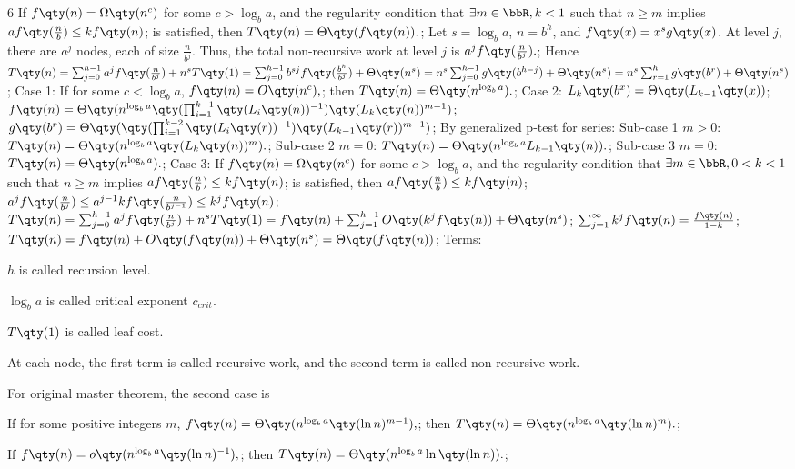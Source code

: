 \documentclass[a4paper,10pt]{extarticle}
\begin{document}
\begin{multicols}{6}
If $f\qty(n)=\Omega\qty(n^c)$ for some $c>\log_ba$, and the regularity condition that $\exists m\in\bbR,k<1$ such that $n\ge m$ implies
\(af\qty(\frac{n}{b})\le kf\qty(n)\); 
is satisfied, then
\(T\qty(n)=\Theta\qty(f\qty(n)).\); 
\bpr
Let $s=\log_ba$, $n=b^h$, and $f\qty(x)=x^sg\qty(x)$. At level $j$, there are $a^j$ nodes, each of size $\frac{n}{b^j}$. Thus, the total non-recursive work at level $j$ is
\(a^jf\qty(\frac{n}{b^j}).\); 
Hence
\(
T\qty(n)=\sum_{j=0}^{h-1}a^jf\qty(\frac{n}{b^j})+n^sT\qty(1)
=\sum_{j=0}^{h-1}b^{sj}f\qty(\frac{b^h}{b^j})+\Theta\qty(n^s)
=n^s\sum_{j=0}^{h-1}g\qty(b^{h-j})+\Theta\qty(n^s)
=n^s\sum_{r=1}^hg\qty(b^r)+\Theta\qty(n^s)
\); 
Case 1: If for some $c<\log_ba$,
\(f\qty(n)=O\qty(n^c),\); 
then
\(T\qty(n)=\Theta\qty(n^{\log_ba}).\); 
Case 2:
\(L_{k}\qty(b^x)=\Theta\qty(L_{k-1}\qty(x))\); 
\(f\qty(n)=\Theta\qty(n^{\log_ba}\qty(\prod_{i=1}^{k-1}\qty(L_{i}\qty(n))^{-1})\qty(L_{k}\qty(n))^{m-1})\); 
\(g\qty(b^r)=\Theta\qty(\qty(\prod_{i=1}^{k-2}\qty(L_{i}\qty(r))^{-1})\qty(L_{k-1}\qty(r))^{m-1})\); 
By generalized p-test for series: Sub-case 1 $m>0$:
\(T\qty(n)=\Theta\qty(n^{\log_ba}\qty(L_{k}\qty(n))^m).\); 
Sub-case 2 $m=0$:
\(T\qty(n)=\Theta\qty(n^{\log_ba}L_{k-1}\qty(n)).\); 
Sub-case 3 $m=0$:
\(T\qty(n)=\Theta\qty(n^{\log_ba}).\); 
Case 3: If $f\qty(n)=\Omega\qty(n^c)$ for some $c>\log_ba$, and the regularity condition that $\exists m\in\bbR,0<k<1$ such that $n\ge m$ implies
\(af\qty(\frac{n}{b})\le kf\qty(n)\); 
is satisfied, then
\(af\qty(\frac{n}{b})\le kf\qty(n)\); 
\(a^jf\qty(\frac{n}{b^j})\le a^{j-1}kf\qty(\frac{n}{b^{j-1}})\le k^jf\qty(n)\); 
\(
T\qty(n)=\sum_{j=0}^{h-1}a^jf\qty(\frac{n}{b^j})+n^sT\qty(1)
=f\qty(n)+\sum_{j=1}^{h-1}O\qty(k^jf\qty(n))+\Theta\qty(n^s)
\); 
\(\sum_{j=1}^{\infty}k^jf\qty(n)=\frac{f\qty(n)}{1-k}\); 
\(T\qty(n)=f\qty(n)+O\qty(f\qty(n))+\Theta\qty(n^s)=\Theta\qty(f\qty(n))\); 
\epr
Terms:

$h$ is called recursion level.

$\log_ba$ is called critical exponent $c_{crit}$.

$T\qty(1)$ is called leaf cost.

At each node, the first term is called recursive work, and the second term is called non-recursive work.

For original master theorem, the second case is

If for some positive integers $m$, 
\(f\qty(n)=\Theta\qty(n^{\log_ba}\qty(\ln n)^{m-1}),\); 
then
\(T\qty(n)=\Theta\qty(n^{\log_ba}\qty(\ln n)^m).\); 

If
\(f\qty(n)=o\qty(n^{\log_ba}\qty(\ln n)^{-1}),\); 
then
\(T\qty(n)=\Theta\qty(n^{\log_ba}\ln\qty(\ln n)).\); 


\end{multicols}
\end{document}
